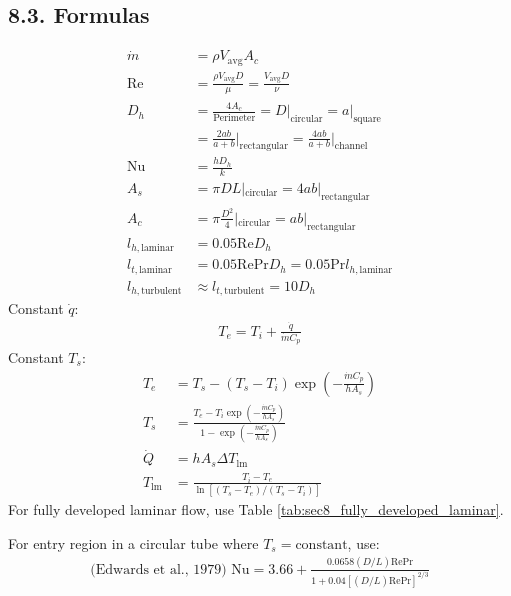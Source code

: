 \documentclass[10pt]{article}
\begin{document}
\begin{multicols*}{2}
\subsection*{8.3. Formulas}
\vspace{-0.4cm}
\begin{align*}
    \dot{m} &= \rho V_{\text{avg}} A_c \\
    \text{Re} &= \frac{\rho V_{\text{avg}} D}{\mu}  = \frac{V_{\text{avg}} D}{\nu} \\
    D_h &= \frac{4 A_c}{\text{Perimeter}} = D\rvert_{\text{circular}} = a\rvert_{\text{square}}   \\
    &= \frac{2ab}{a + b} \bigg\rvert_{\text{rectangular}} = \frac{4ab}{a+b}\bigg\rvert_{\text{channel}} \\
    \text{Nu} &= \frac{hD_h}{k} \\ 
    A_s &= \pi D L|_{\text{circular}} = 4ab|_{\text{rectangular}} \\
    A_c &= \pi \frac{D^2}{4}|_{\text{circular}} = ab|_{\text{rectangular}} \\
    l_{h, \text{laminar}} &= 0.05 \text{Re} D_h \\
    l_{t, \text{laminar}} &= 0.05 \text{Re} \text{Pr} D_h = 0.05 \text{Pr} l_{h, \text{laminar}} \\
    l_{h, \text{turbulent}} &\approx l_{t, \text{turbulent}} = 10D_h 
\end{align*}
\vspace{-0.5cm}
Constant $\dot{q}$:
\begin{align*}
    T_e = T_i + \frac{\dot{q}}{\dot{m} C_p} 
\end{align*}
Constant $T_s$:
\vspace{-0.5cm}
\begin{align*}
    T_e &= T_s - (T_s - T_i) \exp\left(-\frac{\dot{m} C_p}{h A_s}\right) \\
    T_s &=\frac{T_e - T_i \exp\left(-\frac{\dot{m} C_p}{h A_s}\right)}{1 - \exp\left(-\frac{\dot{m} C_p}{h A_s}\right)} \\
    \dot{Q} &= h A_s \Delta T_{\text{lm}} \\
    T_{\text{lm}} &= \frac{T_{i} - T_{e}}{\ln[(T_{s} - T_{e})/(T_{s} - T_{i})]} 
\end{align*}    
For fully developed laminar flow, use Table \ref{tab:sec8_fully_developed_laminar}.

For entry region in a circular tube where $T_s = \text{constant}$, use:
\vspace{-0.5cm}
\begin{align*}
    \text{(Edwards et al., 1979) } \text{Nu} = 3.66 + \frac{0.0658(D/L) \text{Re} \text{Pr}}{1 + 0.04[(D/L) \text{Re} \text{Pr}]^{2/3}} 
\end{align*}


\end{multicols*}
\end{document}
